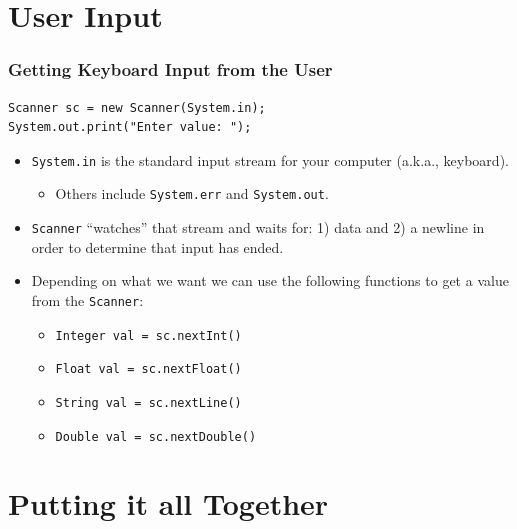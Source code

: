 \documentclass{beamer}
\begin{document}
\section{User Input}
\begin{frame}[fragile]
    \frametitle{Getting Keyboard Input from the User}
    \begin{lstlisting}[basicstyle=\scriptsize]
Scanner sc = new Scanner(System.in);
System.out.print("Enter value: ");
    \end{lstlisting}
    \begin{itemize}
        \item \lstinline|System.in| is the standard input stream for your computer (a.k.a., keyboard).
        \begin{itemize}
            \item Others include \lstinline|System.err| and \lstinline|System.out|.
        \end{itemize}
        \item \lstinline|Scanner| ``watches'' that stream and waits for: 1) data and 2) a newline in order to determine that input has ended.
        \item Depending on what we want we can use the following functions to get a value from the \lstinline|Scanner|:
        \begin{itemize}
            \item \lstinline|Integer val = sc.nextInt()|
            \item \lstinline|Float val = sc.nextFloat()|
            \item \lstinline|String val = sc.nextLine()|
            \item \lstinline|Double val = sc.nextDouble()|
        \end{itemize}
    \end{itemize}
\end{frame}

\section{Putting it all Together}
\end{document}
